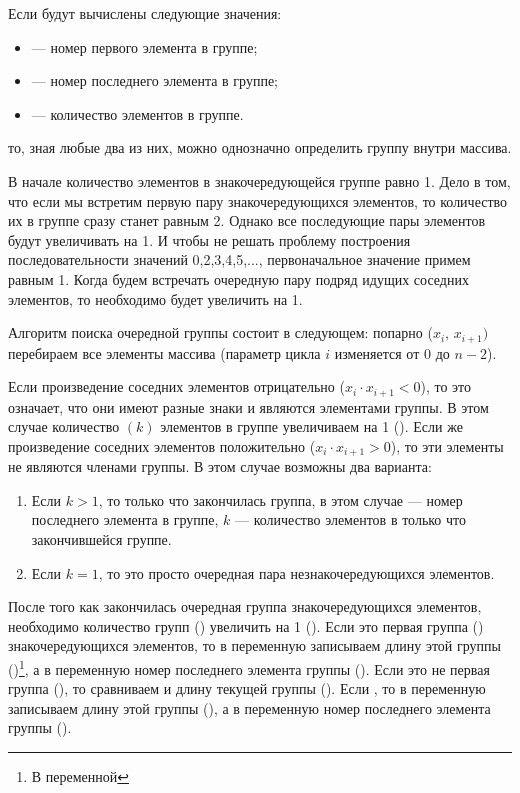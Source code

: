 
Если будут вычислены следующие значения:
\begin{itemize}
\item {} --- номер первого элемента в группе;
\item {} --- номер последнего элемента в группе;
\item {} --- количество элементов в группе.
\end{itemize}
то, зная любые два из них, можно однозначно определить группу внутри массива.

В начале количество элементов в знакочередующейся группе равно 1. Дело в том, что если мы встретим первую пару
знакочередующихся элементов, то количество их в группе сразу станет равным 2. Однако все последующие пары элементов
будут увеличивать  на 1. И чтобы не решать проблему построения последовательности значений
 0,2,3,4,5,..., первоначальное значение  примем равным 1. Когда будем встречать
очередную пару подряд идущих соседних элементов, то  необходимо будет увеличить на 1.

Алгоритм поиска очередной группы состоит в следующем: попарно ($x_i$, $x_{i+1})$ перебираем все элементы массива
(параметр цикла $i$ изменяется от 0 до $n-2$). 

Если произведение соседних элементов отрицательно ($x_i\cdot x_{i+1} < 0$), то это означает, что они имеют разные знаки и
являются элементами группы. В этом случае количество $(k)$ элементов в группе увеличиваем на 1 ().
Если же произведение соседних элементов положительно ($x_i\cdot x_{i+1} > 0$), то эти элементы не являются членами
группы. В этом случае возможны два варианта:

\begin{enumerate}
\item Если  $k>1$, то только что закончилась группа, в этом случае  --- номер последнего элемента
в группе, $k$ --- количество элементов в только что закончившейся группе.
\item Если  $k=1$, то это просто очередная пара незнакочередующихся элементов.
\end{enumerate}
После того как закончилась очередная группа знакочередующихся элементов, необходимо количество групп
() увеличить на 1 (). Если это первая группа ()
знакочередующихся элементов, то в переменную  записываем длину этой группы
()\footnote{В переменной}, а в переменную
 номер последнего элемента группы
(). Если это не первая группа
(), то сравниваем  и длину текущей группы
(). Если , то в переменную 
записываем длину этой группы (), а в переменную
 номер последнего элемента группы
(). 

